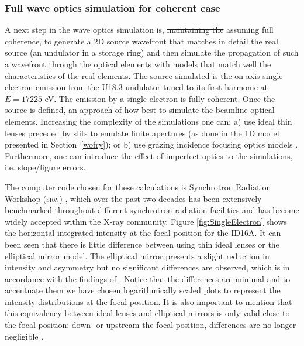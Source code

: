 \documentclass{iucr}              %
\begin{document}
\subsubsection{Full wave optics simulation for coherent case}
\label{srw_se}

A next step in the wave optics simulation is, {\color{green}\sout{maintaining the} assuming} full coherence, to generate a 2D source wavefront that matches in detail the real source (an undulator in a storage ring) and then simulate the propagation of such a wavefront through the optical elements with models that match well the characteristics of the real elements. The source simulated is the on-axis-single-electron emission from the U18.3 undulator tuned to its first harmonic at $E=17225$ eV. The emission by a single-electron is fully coherent. Once the source is defined, an approach of how best to simulate the beamline optical elements. Increasing the complexity of the simulations one can: a) use ideal thin lenses preceded by slits to emulate finite apertures (as done in the 1D model presented in Section~\ref{wofry}); or b) use grazing incidence focusing optics models \cite{Canestrari2014}. Furthermore, one can introduce the effect of imperfect optics to the simulations, i.e. slope/figure errors. 

The computer code chosen for these calculations is Synchrotron Radiation Workshop (\textsc{srw}) \cite{codeSRW}, which over the past two decades has been extensively benchmarked throughout different synchrotron radiation facilities and has become widely accepted within the X-ray community. Figure \ref{fig:SingleElectron} shows the horizontal integrated intensity at the focal position for the ID16A. It can been seen that there is little difference between using thin ideal lenses or the elliptical mirror model. The elliptical mirror presents a slight reduction in intensity and asymmetry but no significant differences are observed, which is in accordance with  the findings of \cite{Canestrari2014}. Notice that the differences are minimal and to accentuate them we have chosen logarithmically scaled plots to represent the intensity distributions at the focal position. It is also important to mention that this equivalency between ideal lenses and elliptical mirrors is only valid close to the focal position: down- or upstream the focal position, differences are no longer negligible \cite{Canestrari2014}. 
\end{document}
